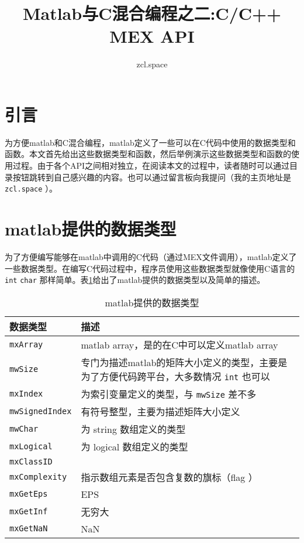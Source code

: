 \documentclass[10pt,a4paper,UTF8]{article}
\author{zcl.space}
\date{}
\title{Matlab与C混合编程之二:C/C++ MEX API}
\begin{document}
\maketitle\xiaosihao
\tableofcontents\newpage\newpage




\section{引言}
\label{sec:orgheadline1}


为方便matlab和C混合编程，matlab定义了一些可以在C代码中使用的数据类型和函数。本文首先给出这些数据类型和函数，然后举例演示这些数据类型和函数的使用过程。由于各个API之间相对独立，在阅读本文的过程中，读者随时可以通过目录按钮跳转到自己感兴趣的内容。也可以通过留言板向我提问（我的主页地址是 \texttt{zcl.space} ）。

\section{matlab提供的数据类型}
\label{sec:orgheadline2}



为了方便编写能够在matlab中调用的C代码（通过MEX文件调用），matlab定义了一些数据类型。在编写C代码过程中，程序员使用这些数据类型就像使用C语言的 \texttt{int} \texttt{char} 那样简单。表\ref{tab:orgtable1}给出了matlab提供的数据类型以及简单的描述。

\begin{table}[htb]
\caption{\label{tab:orgtable1}
matlab提供的数据类型}
\centering
\begin{tabular}{ll}
\hline
数据类型 & 描述\\
\hline
\texttt{mxArray} & matlab array，是的在C中可以定义matlab array\\
\texttt{mwSize} & 专门为描述matlab的矩阵大小定义的类型，主要是为了方便代码跨平台，大多数情况 \texttt{int} 也可以\\
\texttt{mxIndex} & 为索引变量定义的类型，与 \texttt{mwSize} 差不多\\
\texttt{mwSignedIndex} & 有符号整型，主要为描述矩阵大小定义\\
\texttt{mwChar} & 为 string 数组定义的类型\\
\texttt{mxLogical} & 为 logical 数组定义的类型\\
\texttt{mxClassID} & \\
\texttt{mxComplexity} & 指示数组元素是否包含复数的旗标（flag ）\\
\texttt{mxGetEps} & EPS\\
\texttt{mxGetInf} & 无穷大\\
\texttt{mxGetNaN} & NaN\\
\hline
\end{tabular}
\end{table}
\end{document}
